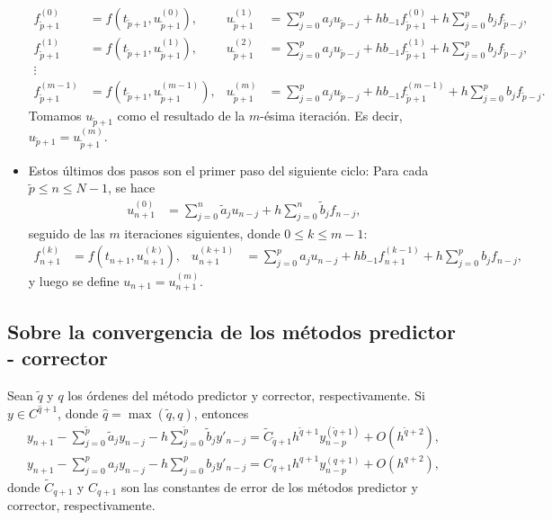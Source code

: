 \documentclass[11pt,letterpaper]{report}
\begin{document}
\begin{itemize}
    \begin{align}
      f_{\tilde p + 1}^{(0)}
      &= f(t_{\tilde p+1},u_{\tilde p + 1}^{(0)}),
      &
        u_{\tilde p + 1}^{(1)}
        &= \sum_{j=0}^{p}a_ju_{\tilde p-j}
        + h b_{-1}f_{\tilde p+1}^{(0)}
        + h \sum_{j=0}^{p}b_jf_{\tilde p-j},
        \\
      f_{\tilde p + 1}^{(1)}
      &= f(t_{\tilde p+1},u_{\tilde p + 1}^{(1)}),
      &
        u_{\tilde p + 1}^{(2)}
        &= \sum_{j=0}^{p}a_ju_{\tilde p-j}
        + h b_{-1}f_{\tilde p+1}^{(1)}
        + h \sum_{j=0}^{p}b_jf_{\tilde p-j},
        \\
      \vdots \nonumber
      \\
      f_{\tilde p + 1}^{(m-1)}
      &= f(t_{\tilde p+1},u_{\tilde p + 1}^{(m-1)}),
      &
        u_{\tilde p + 1}^{(m)}
        &= \sum_{j=0}^{p}a_ju_{\tilde p-j}
        + h b_{-1}f_{\tilde p+1}^{(m-1)}
        + h \sum_{j=0}^{p}b_jf_{\tilde p-j}.
    \end{align}
    Tomamos $u_{\tilde p+1}$ como el resultado de la $m$-ésima
    iteración. Es decir, $u_{\tilde p+1} = u_{\tilde p + 1}^{(m)}$.
  \item
    Estos últimos dos pasos son el primer paso del siguiente ciclo:
    Para cada $\tilde p\leq n\leq N-1$, se hace
    \begin{align}
      u_{n+1}^{(0)}
      &=
      \sum_{j=0}^{n}\tilde a_j u_{n-j}
      + h \sum_{j=0}^{n}\tilde b_j f_{n-j}
    ,\end{align}
    seguido de las $m$ iteraciones siguientes, donde $0\leq k\leq
    m-1$:
    \begin{align}
      f_{n + 1}^{(k)}
      &= f(t_{n+1},u_{n + 1}^{(k)}),
      &
        u_{n + 1}^{(k+1)}
        &= \sum_{j=0}^{p}a_ju_{n-j}
        + h b_{-1}f_{n+1}^{(k-1)}
        + h \sum_{j=0}^{p}b_jf_{n-j},
    \end{align}
    y luego se define $u_{n+1}=u_{n+1}^{(m)}$.
\end{itemize}

\subsection{Sobre la convergencia de los métodos predictor -
corrector}

Sean $\tilde q$ y $q$ los órdenes del método predictor y corrector,
respectivamente. Si $y\in C^{\hat q+1}$, donde $\hat q=\max(\tilde
q,q)$, entonces
\begin{align}
  y_{n+1}
  - \sum_{j=0}^{\tilde p}\tilde a_j y_{n-j}
  - h \sum_{j=0}^{\tilde p} \tilde b_j y'_{n-j}
  = \tilde C_{\tilde q + 1}h^{\tilde q + 1}y^{(\tilde q + 1)}_{n-p}
  + O(h^{\tilde q + 2}),
  \\
  y_{n+1}
  - \sum_{j=0}^{p}a_j y_{n-j}
  - h \sum_{j=0}^{p} b_j y'_{n-j}
  = C_{q + 1}h^{q + 1}y^{(q + 1)}_{n-p}
  + O(h^{q + 2})
,\end{align}
donde $\tilde C_{q+1}$ y $C_{q+1}$ son las constantes de error de los
métodos predictor y corrector, respectivamente.
\end{document}
